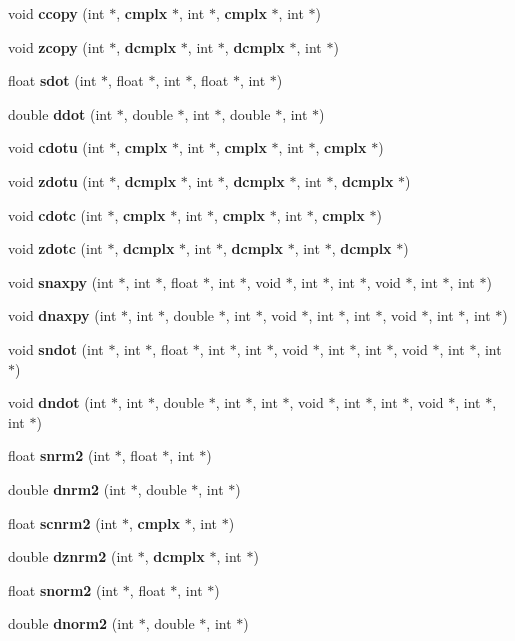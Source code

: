 \begin{CompactItemize}
\item 
void {\bf ccopy} (int $\ast$, {\bf cmplx} $\ast$, int $\ast$, {\bf cmplx} $\ast$, int $\ast$)
\item 
void {\bf zcopy} (int $\ast$, {\bf dcmplx} $\ast$, int $\ast$, {\bf dcmplx} $\ast$, int $\ast$)
\item 
float {\bf sdot} (int $\ast$, float $\ast$, int $\ast$, float $\ast$, int $\ast$)
\item 
double {\bf ddot} (int $\ast$, double $\ast$, int $\ast$, double $\ast$, int $\ast$)
\item 
void {\bf cdotu} (int $\ast$, {\bf cmplx} $\ast$, int $\ast$, {\bf cmplx} $\ast$, int $\ast$, {\bf cmplx} $\ast$)
\item 
void {\bf zdotu} (int $\ast$, {\bf dcmplx} $\ast$, int $\ast$, {\bf dcmplx} $\ast$, int $\ast$, {\bf dcmplx} $\ast$)
\item 
void {\bf cdotc} (int $\ast$, {\bf cmplx} $\ast$, int $\ast$, {\bf cmplx} $\ast$, int $\ast$, {\bf cmplx} $\ast$)
\item 
void {\bf zdotc} (int $\ast$, {\bf dcmplx} $\ast$, int $\ast$, {\bf dcmplx} $\ast$, int $\ast$, {\bf dcmplx} $\ast$)
\item 
void {\bf snaxpy} (int $\ast$, int $\ast$, float $\ast$, int $\ast$, void $\ast$, int $\ast$, int $\ast$, void $\ast$, int $\ast$, int $\ast$)
\item 
void {\bf dnaxpy} (int $\ast$, int $\ast$, double $\ast$, int $\ast$, void $\ast$, int $\ast$, int $\ast$, void $\ast$, int $\ast$, int $\ast$)
\item 
void {\bf sndot} (int $\ast$, int $\ast$, float $\ast$, int $\ast$, int $\ast$, void $\ast$, int $\ast$, int $\ast$, void $\ast$, int $\ast$, int $\ast$)
\item 
void {\bf dndot} (int $\ast$, int $\ast$, double $\ast$, int $\ast$, int $\ast$, void $\ast$, int $\ast$, int $\ast$, void $\ast$, int $\ast$, int $\ast$)
\item 
float {\bf snrm2} (int $\ast$, float $\ast$, int $\ast$)
\item 
double {\bf dnrm2} (int $\ast$, double $\ast$, int $\ast$)
\item 
float {\bf scnrm2} (int $\ast$, {\bf cmplx} $\ast$, int $\ast$)
\item 
double {\bf dznrm2} (int $\ast$, {\bf dcmplx} $\ast$, int $\ast$)
\item 
float {\bf snorm2} (int $\ast$, float $\ast$, int $\ast$)
\item 
double {\bf dnorm2} (int $\ast$, double $\ast$, int $\ast$)

\end{CompactItemize}
